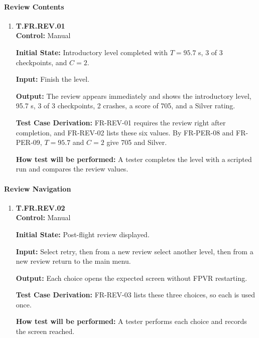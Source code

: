\documentclass[12pt, titlepage]{article}
\begin{document}
{\sloppy
\paragraph{Review Contents}

\begin{enumerate}

\item{\hypertarget{test-fr-rev-01}{}\textbf{T.FR.REV.01}\\}
\textbf{Control:} Manual

\textbf{Initial State:} Introductory level completed with \(T = 95.7\) s, 3 of 3
checkpoints, and \(C = 2\).

\textbf{Input:} Finish the level.

\textbf{Output:} The review appears immediately and shows the introductory level, 95.7
s, 3 of 3 checkpoints, 2 crashes, a score of 705, and a Silver rating.

\textbf{Test Case Derivation:} \mbox{FR-REV-01} requires the review right after
completion, and \mbox{FR-REV-02} lists these six values. By \mbox{FR-PER-08} and
\mbox{FR-PER-09}, \(T = 95.7\) and \(C = 2\) give 705 and Silver.

\textbf{How test will be performed:} A tester completes the level with a scripted run
and compares the review values.

\end{enumerate}

\paragraph{Review Navigation}

\begin{enumerate}

\item{\hypertarget{test-fr-rev-02}{}\textbf{T.FR.REV.02}\\}
\textbf{Control:} Manual

\textbf{Initial State:} Post-flight review displayed.

\textbf{Input:} Select retry, then from a new review select another level, then from a
new review return to the main menu.

\textbf{Output:} Each choice opens the expected screen without FPVR restarting.

\textbf{Test Case Derivation:} \mbox{FR-REV-03} lists these three choices, so each is
used once.

\textbf{How test will be performed:} A tester performs each choice and records the
screen reached.


\end{enumerate}}
\end{document}
